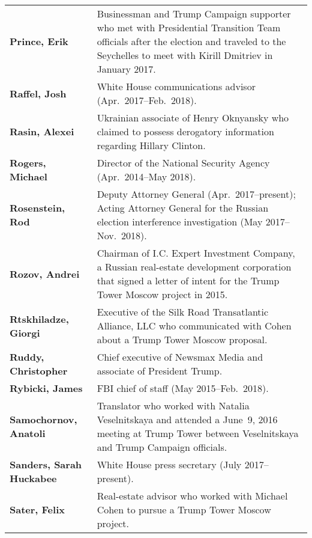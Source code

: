 \begin{longtable}{ p{} p{} }
    \textbf{Prince, Erik} & Businessman and Trump Campaign supporter who met with Presidential Transition Team officials after the election and traveled to the Seychelles to meet with Kirill Dmitriev in January 2017. \\

    \textbf{Raffel, Josh} & White House communications advisor (Apr.~2017--Feb.~2018). \\

    \textbf{Rasin, Alexei} & Ukrainian associate of Henry Oknyansky who claimed to possess derogatory information regarding Hillary Clinton. \\

    \textbf{Rogers, Michael} & Director of the National Security Agency (Apr.~2014--May 2018). \\

    \textbf{Rosenstein, Rod} & Deputy Attorney General (Apr.~2017--present); Acting Attorney General for the Russian election interference investigation (May 2017--Nov.~2018). \\

    \textbf{Rozov, Andrei} & Chairman of I.C. Expert Investment Company, a Russian real-estate development corporation that signed a letter of intent for the Trump Tower Moscow project in 2015. \\

    \textbf{Rtskhiladze, Giorgi} & Executive of the Silk Road Transatlantic Alliance, LLC who communicated with Cohen about a Trump Tower Moscow proposal. \\

    \textbf{Ruddy, Christopher} & Chief executive of Newsmax Media and associate of President Trump. \\

    \textbf{Rybicki, James} & FBI chief of staff (May 2015--Feb.~2018). \\

    \textbf{Samochornov, Anatoli} & Translator who worked with Natalia Veselnitskaya and attended a June~9, 2016 meeting at Trump Tower between Veselnitskaya and Trump Campaign officials. \\

    \textbf{Sanders, Sarah Huckabee} & White House press secretary (July 2017--present). \\

    \textbf{Sater, Felix} & Real-estate advisor who worked with Michael Cohen to pursue a Trump Tower Moscow project. \\


\end{longtable}
